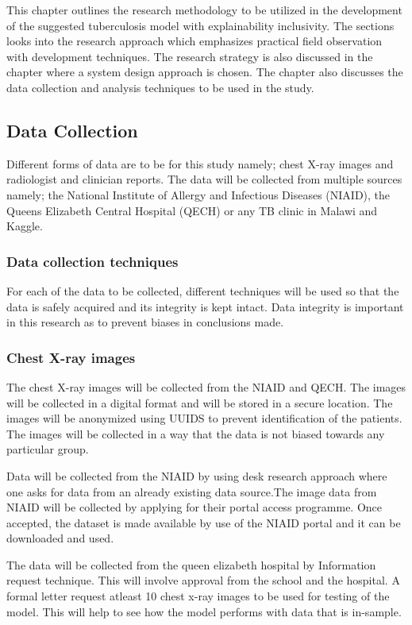 \documentclass[12pt,a4paper]{article}
\begin{document}
This chapter outlines the research methodology to be utilized in the development of the suggested tuberculosis model with explainability inclusivity. The sections looks into the research approach which emphasizes practical field observation with development techniques. The research strategy is also discussed in the chapter where a system design approach is chosen. The chapter also discusses the data collection and analysis techniques to be used in the study.  

\subsection{Data Collection} 
Different forms of data are to be for this study namely; chest X-ray images and radiologist and clinician reports. The data will be collected from multiple sources namely; the National Institute of Allergy and Infectious Diseases (NIAID), the Queens Elizabeth Central Hospital (QECH) or any TB clinic in Malawi and Kaggle.

\subsubsection{Data collection techniques}
For each of the data to be collected, different techniques will be used so that the data is safely acquired and its integrity is kept intact. Data integrity is important in this research as to prevent biases in conclusions made.

\subsubsection{Chest X-ray images}
The chest X-ray images will be collected from the NIAID and QECH. The images will be collected in a digital format and will be stored in a secure location. The images will be anonymized using UUIDS to prevent identification of the patients. The images will be collected in a way that the data is not biased towards any particular group.

Data will be collected from the NIAID by using desk research approach where one asks for data from an already existing data source.The image data from NIAID will be collected by applying for their portal access programme. Once accepted, the dataset is made available by use of the NIAID portal and it can be downloaded and used.

The data will be collected from the queen elizabeth hospital by Information request technique. This will involve approval from the school and the hospital. A formal letter request atleast 10 chest x-ray images to be used for testing of the model. This will help to see how the model performs with data that is in-sample. 
\end{document}
